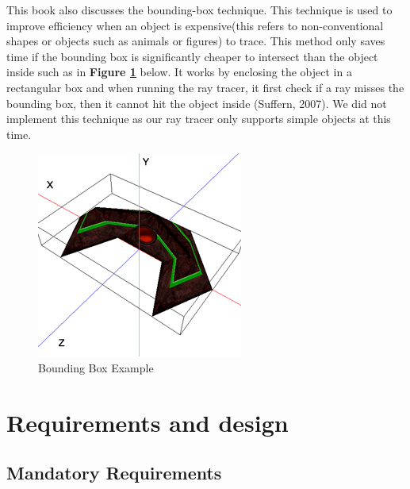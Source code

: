 \documentclass[a4paper]{article}
\begin{document}
	\par This book also discusses the bounding-box technique. This technique is used to improve efficiency when an object is expensive(this refers to non-conventional shapes or objects such as animals or figures) to trace. This method only saves time if the bounding box is significantly cheaper to intersect than the object inside such as in \textbf{Figure \ref{fig:boundingbox}} below. It works by enclosing the object in a rectangular box and when running the ray tracer, it first check if a ray misses the bounding box, then it cannot hit the object inside (Suffern, 2007). We did not implement this technique as our ray tracer only supports simple objects at this time.
	
	\begin{figure}[ht!]
		\centering
		\includegraphics[scale=0.60]{./boundingbox.png}
		\caption{Bounding Box Example}
		\label{fig:boundingbox}
	\end{figure}
	
	
	
	\section{Requirements and design}
	
	
	\subsection{Mandatory Requirements}
	
\end{document}
